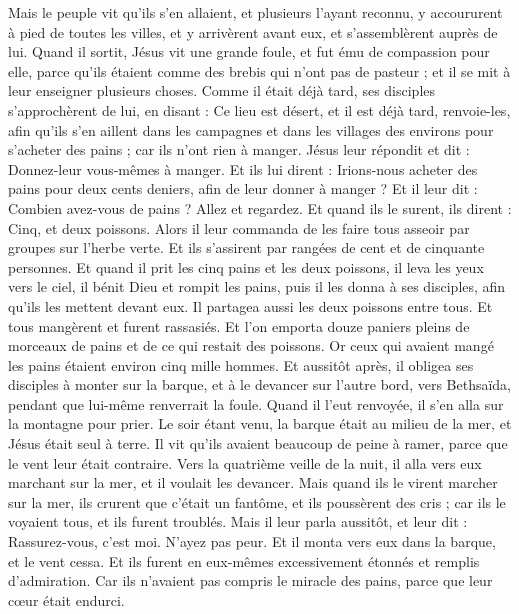 \begin{multicols}{2}
Mais le peuple vit qu’ils s’en allaient, et plusieurs l’ayant reconnu, y accoururent à pied de toutes les villes, et y arrivèrent avant eux, et s’assemblèrent auprès de lui.
Quand il sortit, Jésus vit une grande foule, et fut ému de compassion pour elle, parce qu’ils étaient comme des brebis qui n'ont pas de pasteur ; et il se mit à leur enseigner plusieurs choses.
Comme il était déjà tard, ses disciples s'approchèrent de lui, en disant : Ce lieu est désert, et il est déjà tard,
renvoie-les, afin qu’ils s'en aillent dans les campagnes et dans les villages des environs pour s’acheter des pains ; car ils n'ont rien à manger.
Jésus leur répondit et dit : Donnez-leur vous-mêmes à manger. Et ils lui dirent : Irions-nous acheter des pains pour deux cents deniers, afin de leur donner à manger ?
Et il leur dit : Combien avez-vous de pains ? Allez et regardez. Et quand ils le surent, ils dirent : Cinq, et deux poissons.
Alors il leur commanda de les faire tous asseoir par groupes sur l'herbe verte.
Et ils s'assirent par rangées de cent et de cinquante personnes.
Et quand il prit les cinq pains et les deux poissons, il leva les yeux vers le ciel, il bénit Dieu et rompit les pains, puis il les donna à ses disciples, afin qu'ils les mettent devant eux. Il partagea aussi les deux poissons entre tous.
Et tous mangèrent et furent rassasiés.
Et l’on emporta douze paniers pleins de morceaux de pains et de ce qui restait des poissons.
Or ceux qui avaient mangé les pains étaient environ cinq mille hommes.
Et aussitôt après, il obligea ses disciples à monter sur la barque, et à le devancer sur l’autre bord, vers Bethsaïda, pendant que lui-même renverrait la foule.
Quand il l’eut renvoyée, il s'en alla sur la montagne pour prier.
Le soir étant venu, la barque était au milieu de la mer, et Jésus était seul à terre.
Il vit qu'ils avaient beaucoup de peine à ramer, parce que le vent leur était contraire. Vers la quatrième veille de la nuit, il alla vers eux marchant sur la mer, et il voulait les devancer.
Mais quand ils le virent marcher sur la mer, ils crurent que c’était un fantôme, et ils poussèrent des cris ;
car ils le voyaient tous, et ils furent troublés. Mais il leur parla aussitôt, et leur dit : Rassurez-vous, c'est moi. N’ayez pas peur.
Et il monta vers eux dans la barque, et le vent cessa. Et ils furent en eux-mêmes excessivement étonnés et remplis d’admiration.
Car ils n'avaient pas compris le miracle des pains, parce que leur cœur était endurci.

\end{multicols}
